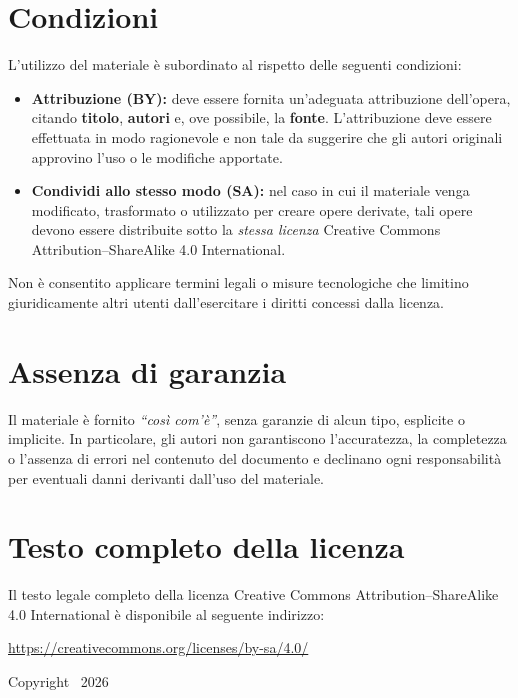\section*{Condizioni}

L'utilizzo del materiale è subordinato al rispetto delle seguenti condizioni:

\begin{itemize}
  \item \textbf{Attribuzione (BY):} deve essere fornita un'adeguata attribuzione
  dell'opera, citando \textbf{titolo}, \textbf{autori} e, ove possibile, la \textbf{fonte}.
  L'attribuzione deve essere effettuata in modo ragionevole e non tale da suggerire
  che gli autori originali approvino l'uso o le modifiche apportate.

  \item \textbf{Condividi allo stesso modo (SA):} nel caso in cui il materiale
  venga modificato, trasformato o utilizzato per creare opere derivate, tali opere
  devono essere distribuite sotto la \emph{stessa licenza} Creative Commons
  Attribution--ShareAlike 4.0 International.
\end{itemize}

Non è consentito applicare termini legali o misure tecnologiche che limitino
giuridicamente altri utenti dall'esercitare i diritti concessi dalla licenza.

\vspace{1em}

\section*{Assenza di garanzia}

Il materiale è fornito \emph{``così com'è''}, senza garanzie di alcun tipo,
esplicite o implicite. In particolare, gli autori non garantiscono l'accuratezza,
la completezza o l'assenza di errori nel contenuto del documento e declinano
ogni responsabilità per eventuali danni derivanti dall'uso del materiale.

\vspace{1em}

\section*{Testo completo della licenza}

Il testo legale completo della licenza Creative Commons Attribution--ShareAlike
4.0 International è disponibile al seguente indirizzo:
\begin{center}
\begin{minipage}{0.9\textwidth}
\centering
\url{https://creativecommons.org/licenses/by-sa/4.0/}
\end{minipage}
\end{center}

\vspace{1em}

\noindent
Copyright \textcopyright\ 2026 \\ \BookAuthor

\setlength{\parskip}{0pt}
\setlength{\parindent}{15pt}